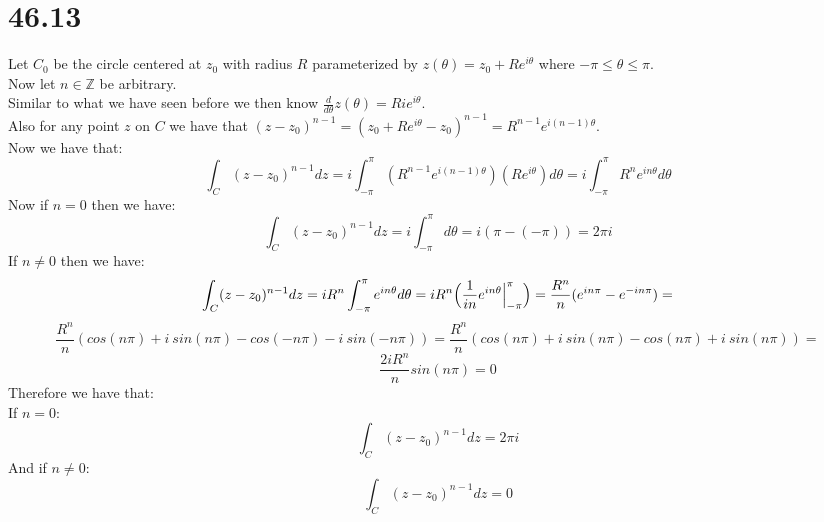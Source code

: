 \documentclass{article}
\begin{document}
\section*{46.13}
\begin{center}
    \doublespacing
    Let $C_0$ be the circle centered at $z_0$ with radius $R$ parameterized by $z(\theta) = z_0 + Re^{i\theta}$ where $-\pi\leq\theta\leq\pi$.
    \\Now let $n\in\mathbb{Z}$ be arbitrary.
    \\Similar to what we have seen before we then know $\frac{d}{d\theta} z(\theta) = Rie^{i\theta}$.
    \\Also for any point $z$ on $C$ we have that $(z - z_0)^{n-1} = (z_0 + Re^{i\theta} - z_0)^{n-1} = R^{n-1} e^{i(n-1)\theta}$.
    \\Now we have that:
    \[\int _C (z - z_0)^{n-1} dz = i\int _{-\pi}^{\pi} (R^{n-1} e^{i(n-1)\theta})(Re^{i\theta}) d\theta = i\int _{-\pi}^{\pi} R^n e^{in\theta} d\theta\]
    Now if $n = 0$ then we have:
    \[\int _C (z - z_0)^{n-1} dz = i\int _{-\pi}^{\pi} d\theta = i(\pi - (-\pi)) = 2\pi i\]
    If $n\neq 0$ then we have:
    \[\int _C (z - z_0)^{n-1} dz = iR^n\int _{-\pi}^{\pi} e^{in\theta} d\theta =iR^n\Big{(}\frac{1}{in} e^{in\theta}\Big{|}_{-\pi}^{\pi}\Big{)} =\frac{R^n}{n} (e^{in\pi} - e^{-in\pi}) =\]
    \[\frac{R^n}{n} (cos(n\pi) + i\:sin(n\pi) - cos(-n\pi) - i\:sin(-n\pi)) =\frac{R^n}{n} (cos(n\pi) + i\:sin(n\pi) - cos(n\pi) + i\:sin(n\pi)) =\]
    \[\frac{2iR^n}{n} sin(n\pi) = 0\]
    Therefore we have that:
    \\If $n = 0$:
    \[\int _C (z - z_0)^{n-1} dz = 2\pi i\]
    And if $n\neq 0$:
    \[\int _C (z - z_0)^{n-1} dz = 0\]
    \qedsymbol
\end{center}


\newpage
\end{document}
